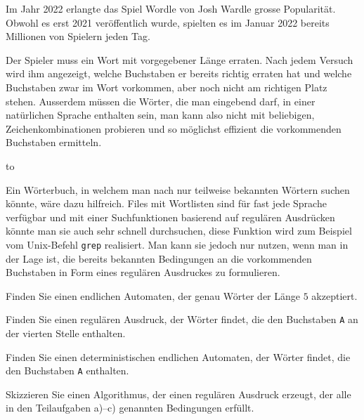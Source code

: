 Im Jahr 2022 erlangte das Spiel Wordle von Josh Wardle grosse Popularität.
Obwohl es erst 2021 veröffentlich wurde, spielten es im Januar 2022
bereits Millionen von Spielern jeden Tag.

Der Spieler muss ein Wort mit vorgegebener Länge erraten.
Nach jedem Versuch wird ihm angezeigt, welche Buchstaben er bereits
richtig erraten hat und welche Buchstaben zwar im Wort vorkommen,
aber noch nicht am richtigen Platz stehen.
Ausserdem müssen die Wörter, die man eingebend darf, in einer
natürlichen Sprache enthalten sein, man kann also nicht mit
beliebigen, Zeichenkombinationen probieren und so möglichst effizient
die vorkommenden Buchstaben ermitteln.

\strut\hbox to

\smallskip

Ein Wörterbuch, in welchem man nach nur teilweise bekannten Wörtern
suchen könnte, wäre dazu hilfreich.
Files mit Wortlisten sind für fast jede Sprache verfügbar und mit
einer Suchfunktionen basierend auf regulären Ausdrücken könnte man
sie auch sehr schnell durchsuchen, diese Funktion wird zum Beispiel
vom Unix-Befehl \texttt{grep} realisiert.
Man kann sie jedoch nur nutzen, wenn man in der Lage ist, die
bereits bekannten Bedingungen an die vorkommenden Buchstaben
in Form eines regulären Ausdruckes zu formulieren.


\begin{teilaufgaben}
\item Finden Sie einen endlichen Automaten, der genau Wörter der
Länge $5$ akzeptiert.
\item Finden Sie einen regulären Ausdruck, der Wörter findet, die
den Buchstaben \texttt{A} an der vierten Stelle enthalten.
\item Finden Sie einen deterministischen endlichen Automaten,
der Wörter findet, die den Buchstaben \texttt{A} enthalten.
\item Skizzieren Sie einen Algorithmus, der einen regulären Ausdruck
erzeugt, der alle in den Teilaufgaben a)--c) genannten Bedingungen erfüllt.
\end{teilaufgaben}

